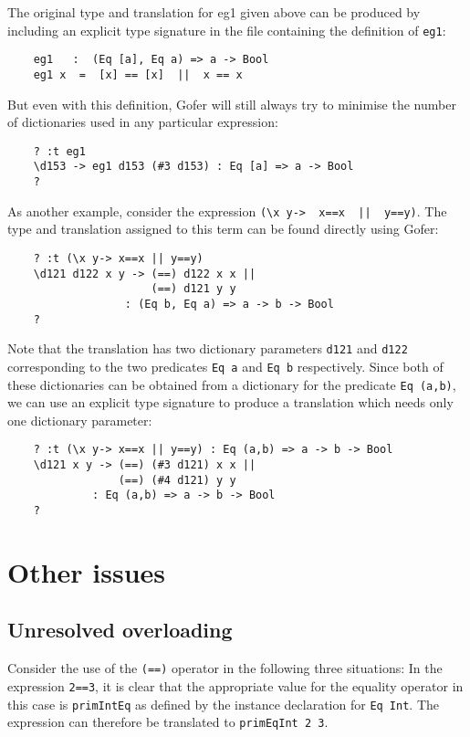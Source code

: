 The original type and translation for eg1 given above can  be  produced
by including an explicit type signature  in  the  file  containing  the
definition of \verb"eg1":
\begin{verbatim}
    eg1   :  (Eq [a], Eq a) => a -> Bool
    eg1 x  =  [x] == [x]  ||  x == x
\end{verbatim}
But even with this definition, Gofer will still always try to  minimise
the number of dictionaries used in any particular expression:
\begin{verbatim}
    ? :t eg1
    \d153 -> eg1 d153 (#3 d153) : Eq [a] => a -> Bool
    ?
\end{verbatim}
As another example, consider the expression \verb"(\x y->  x==x  ||  y==y)".
The type and translation assigned to this term can  be  found  directly
using Gofer:
\begin{verbatim} 
    ? :t (\x y-> x==x || y==y)
    \d121 d122 x y -> (==) d122 x x ||
                      (==) d121 y y
                  : (Eq b, Eq a) => a -> b -> Bool
    ?
\end{verbatim}
Note that the translation has two dictionary parameters \verb"d121"  
and  \verb"d122"
corresponding to the two predicates \verb"Eq a" 
and \verb"Eq b" respectively.   Since
both of these dictionaries can be obtained from a  dictionary  for  the
predicate \verb"Eq (a,b)", we can use an explicit type signature to produce  a
translation which needs only one dictionary parameter:
\begin{verbatim}
    ? :t (\x y-> x==x || y==y) : Eq (a,b) => a -> b -> Bool
    \d121 x y -> (==) (#3 d121) x x ||
                 (==) (#4 d121) y y
             : Eq (a,b) => a -> b -> Bool
    ?
\end{verbatim}

\section{Other issues}

\subsection{Unresolved overloading}
Consider  the  use  of  the  \verb"(==)"  operator  in  the  following   three
situations:
\BI
\IT  In the expression \verb"2==3", it is clear that the appropriate value
     for the equality operator in this case is \verb"primIntEq" as defined  by
     the instance declaration for \verb"Eq Int".  The expression can therefore
     be translated to \verb"primEqInt 2 3".

